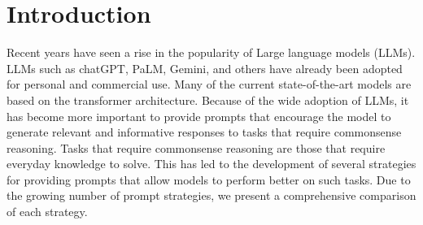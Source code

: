 \documentclass[fleqn,moreauthors,10pt]{ds_report}
\affiliation{\textit{Advisors: Slavko Žitnik}}
\begin{document}
\flushbottom 

\maketitle 

\thispagestyle{empty} 


\section*{Introduction}

    Recent years have seen a rise in the popularity of Large language models (LLMs). LLMs such as chatGPT, PaLM, Gemini, and others have already been adopted for personal and commercial use. Many of the current state-of-the-art models are based on the transformer architecture\cite{DBLP:journals/corr/VaswaniSPUJGKP17}. Because of the wide adoption of LLMs, it has become more important to provide prompts that encourage the model to generate relevant and informative responses to tasks that require commonsense reasoning. Tasks that require commonsense reasoning are those that require everyday knowledge to solve. This has led to the development of several strategies for providing prompts that allow models to perform better on such tasks. Due to the growing number of prompt strategies, we present a comprehensive comparison of each strategy.


\end{document}

